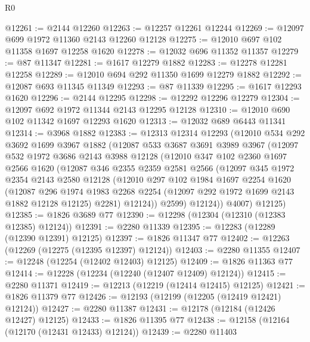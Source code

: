 \begin{lexlean}{R0}
\begin{coremodule}
@12261 := @2144 @12260
@12263 := @12257 @12261 @12244
@12269 := @12097 @699 @1972 @11360 @2143 @12260 @12128
@12275 := @12010 @697 @102 @11358 @1697 @12258 @1620
@12278 := @12032 @696 @11352 @11357
@12279 := @87 @11347
@12281 := @1617 @12279 @1882
@12283 := @12278 @12281 @12258
@12289 := @12010 @694 @292 @11350 @1699 @12279 @1882
@12292 := @12087 @693 @11345 @11349
@12293 := @87 @11339
@12295 := @1617 @12293 @1620
@12296 := @2144 @12295
@12298 := @12292 @12296 @12279
@12304 := @12097 @692 @1972 @11344 @2143 @12295 @12128
@12310 := @12010 @690 @102 @11342 @1697 @12293 @1620
@12313 := @12032 @689 @6443 @11341
@12314 := @3968 @1882
@12383 := @12313
    @12314
    @12293
    (@12010
      @534
      @292
      @3692
      @1699
      @3967
      @1882
      (@12087
        @533
        @3687
        @3691
        @3989
        @3967
        (@12097
          @532
          @1972
          @3686
          @2143
          @3988
          @12128
          (@12010
            @347
            @102
            @2360
            @1697
            @2566
            @1620
            (@12087
              @346
              @2355
              @2359
              @2581
              @2566
              (@12097
                @345
                @1972
                @2354
                @2143
                @2580
                @12128
                (@12010
                  @297
                  @102
                  @1984
                  @1697
                  @2254
                  @1620
                  (@12087
                    @296
                    @1974
                    @1983
                    @2268
                    @2254
                    (@12097 @292 @1972 @1699 @2143 @1882 @12128 @12125)
                    @2281)
                  @12124))
              @2599)
            @12124))
        @4007)
      @12125)
@12385 := @1826 @3689 @77
@12390 := @12298 (@12304 (@12310 (@12383 @12385) @12124))
@12391 := @2280 @11339
@12395 := @12283 (@12289 (@12390 @12391) @12125)
@12397 := @1826 @11347 @77
@12402 := @12263 (@12269 (@12275 (@12395 @12397) @12124))
@12403 := @2280 @11355
@12407 := @12248 (@12254 (@12402 @12403) @12125)
@12409 := @1826 @11363 @77
@12414 := @12228 (@12234 (@12240 (@12407 @12409) @12124))
@12415 := @2280 @11371
@12419 := @12213 (@12219 (@12414 @12415) @12125)
@12421 := @1826 @11379 @77
@12426 := @12193 (@12199 (@12205 (@12419 @12421) @12124))
@12427 := @2280 @11387
@12431 := @12178 (@12184 (@12426 @12427) @12125)
@12433 := @1826 @11395 @77
@12438 := @12158 (@12164 (@12170 (@12431 @12433) @12124))
@12439 := @2280 @11403

\end{coremodule}
\end{lexlean}
